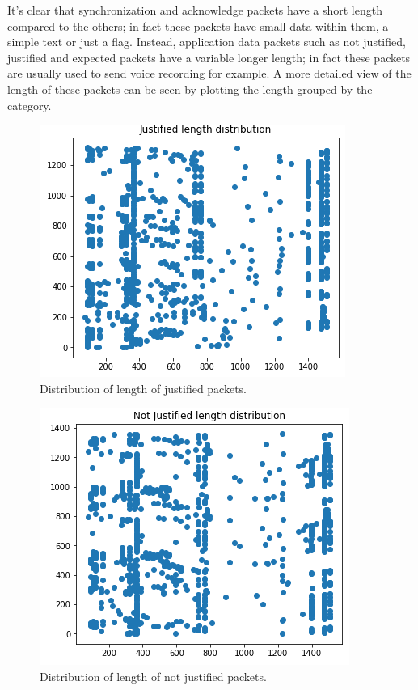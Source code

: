 \documentclass[sigconf]{acmart}
\begin{document}
    It's clear that synchronization and acknowledge packets have a short length compared to the others; in fact these packets have small data within them, a simple text or just a flag.
    Instead, application data packets such as not justified, justified and expected packets have a variable longer length; in fact these packets are usually used to send voice recording for example.
    A more detailed view of the length of these packets can be seen by plotting the length grouped by the category.
    \begin{figure}[h!]
        \includegraphics[width=0.8\linewidth]{img/justified_distribution.png}
        \caption{Distribution of length of justified packets.}
        \label{fig:justified_distribution}
    \end{figure}
    \begin{figure}[h!]
        \includegraphics[width=0.8\linewidth]{img/not_justified_distribution.png}
        \caption{Distribution of length of not justified packets.}
        \label{fig:not_justified_distribution}
    \end{figure}
\end{document}
